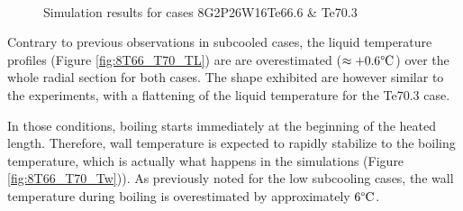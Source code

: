 \begin{figure}[!h]
\centering
{}
\\
\caption{Simulation results for cases 8G2P26W16Te66.6 \& Te70.3}
\label{fig:deb_cfd_8T66_T70}
\end{figure}


Contrary to previous observations in subcooled cases, the liquid temperature profiles (Figure \ref{fig:8T66_T70_TL}) are are overestimated ($\approx +0.6\degree\mathrm{C}$) over the whole radial section for both cases. The shape exhibited are however similar to the experiments, with a flattening of the liquid temperature for the Te70.3 case.

\npar

In those conditions, boiling starts immediately at the beginning of the heated length. Therefore, wall temperature is expected to rapidly stabilize to the boiling temperature, which is actually what happens in the simulations (Figure \ref{fig:8T66_T70_Tw})). As previously noted for the low subcooling cases, the wall temperature during boiling is overestimated by approximately $6\degree\mathrm{C}$. 

